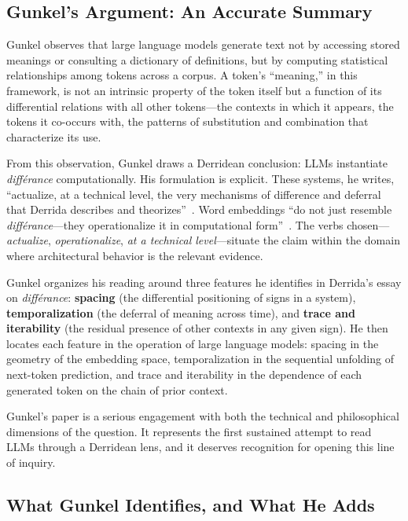 \documentclass[a4paper,twocolumn,11pt]{article}
\begin{document}
\subsection{Gunkel's Argument: An Accurate Summary}

Gunkel observes that large language models generate text not by accessing stored meanings or consulting a dictionary of definitions, but by computing statistical relationships among tokens across a corpus. A token's ``meaning,'' in this framework, is not an intrinsic property of the token itself but a function of its differential relations with all other tokens---the contexts in which it appears, the tokens it co-occurs with, the patterns of substitution and combination that characterize its use.

From this observation, Gunkel draws a Derridean conclusion: LLMs instantiate \emph{diff\'erance} computationally. His formulation is explicit. These systems, he writes, ``actualize, at a technical level, the very mechanisms of difference and deferral that Derrida describes and theorizes''~\cite[\S 1]{Gunkel2025}. Word embeddings ``do not just resemble \emph{diff\'erance}---they operationalize it in computational form''~\cite[\S 3.1]{Gunkel2025}. The verbs chosen---\emph{actualize}, \emph{operationalize}, \emph{at a technical level}---situate the claim within the domain where architectural behavior is the relevant evidence.

Gunkel organizes his reading around three features he identifies in Derrida's essay on \emph{diff\'erance}: \textbf{spacing} (the differential positioning of signs in a system), \textbf{temporalization} (the deferral of meaning across time), and \textbf{trace and iterability} (the residual presence of other contexts in any given sign). He then locates each feature in the operation of large language models: spacing in the geometry of the embedding space, temporalization in the sequential unfolding of next-token prediction, and trace and iterability in the dependence of each generated token on the chain of prior context.

Gunkel's paper is a serious engagement with both the technical and philosophical dimensions of the question. It represents the first sustained attempt to read LLMs through a Derridean lens, and it deserves recognition for opening this line of inquiry.

\subsection{What Gunkel Identifies, and What He Adds}
\end{document}
